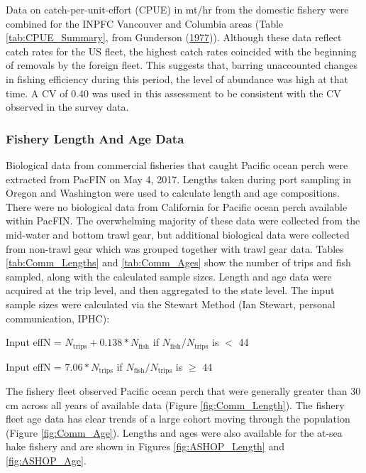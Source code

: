 \documentclass[12pt,]{article}
\begin{document}
Data on catch-per-unit-effort (CPUE) in mt/hr from the domestic fishery
were combined for the INPFC Vancouver and Columbia areas (Table
\ref{tab:CPUE_Summary}, from Gunderson
(\protect\hyperlink{ref-gunderson_population_1977}{1977})). Although
these data reflect catch rates for the US fleet, the highest catch rates
coincided with the beginning of removals by the foreign fleet. This
suggests that, barring unaccounted changes in fishing efficiency during
this period, the level of abundance was high at that time. A CV of 0.40
was used in this assessment to be consistent with the CV observed in the
survey data.

\subsubsection{Fishery Length And Age
Data}\label{fishery-length-and-age-data}

Biological data from commercial fisheries that caught Pacific ocean
perch were extracted from PacFIN on May 4, 2017. Lengths taken during
port sampling in Oregon and Washington were used to calculate length and
age compositions. There were no biological data from California for
Pacific ocean perch available within PacFIN. The overwhelming majority
of these data were collected from the mid-water and bottom trawl gear,
but additional biological data were collected from non-trawl gear which
was grouped together with trawl gear data. Tables \ref{tab:Comm_Lengths}
and \ref{tab:Comm_Ages} show the number of trips and fish sampled, along
with the calculated sample sizes. Length and age data were acquired at
the trip level, and then aggregated to the state level. The input sample
sizes were calculated via the Stewart Method (Ian Stewart, personal
communication, IPHC):

\begin{centering}

Input effN = $N_{\text{trips}} + 0.138 * N_{\text{fish}}$ if $N_{\text{fish}}/N_{\text{trips}}$ is $<$ 44

Input effN = $7.06 * N_{\text{trips}}$ if $N_{\text{fish}}/N_{\text{trips}}$ is $\geq$ 44

\end{centering}

The fishery fleet observed Pacific ocean perch that were generally
greater than 30 cm across all years of available data (Figure
\ref{fig:Comm_Length}). The fishery fleet age data has clear trends of a
large cohort moving through the population (Figure \ref{fig:Comm_Age}).
Lengths and ages were also available for the at-sea hake fishery and are
shown in Figures \ref{fig:ASHOP_Length} and \ref{fig:ASHOP_Age}.
\end{document}
